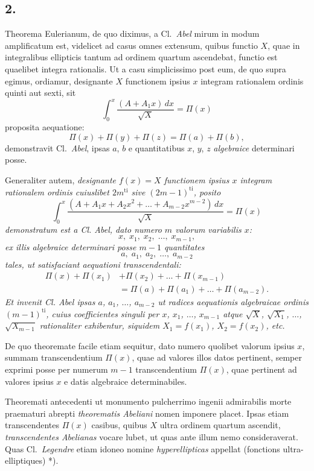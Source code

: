 \documentclass{article}
\begin{document}
\subsection*{2.}

Theorema Eulerianum, de quo diximus, a Cl.\ \emph{Abel} mirum in modum amplificatum est, videlicet ad casus omnes extensum, quibus functio $X$, quae in integralibus ellipticis tantum ad ordinem quartum ascendebat, functio est quaelibet integra rationalis. Ut a casu simplicissimo post eum, de quo supra egimus, ordiamur, designante $X$ functionem ipsius $x$ integram rationalem ordinis quinti aut sexti, sit
\[ \int_0^{x} \frac{(A + A_1 x)\,dx}{\sqrt{X}} = \Pi(x) \]
proposita aequatione:
\[ \Pi(x) + \Pi(y) + \Pi(z) = \Pi(a) + \Pi(b), \]
demonstravit Cl.\ \emph{Abel}, ipsas $a$, $b$ e quantitatibus $x$, $y$, $z$ \emph{algebraice} determinari posse.

Generaliter autem, \emph{designante $f(x) = X$ functionem ipsius $x$ integram rationalem ordinis cuiuslibet $2m^{\text{ti}}$ sive $(2m-1)^{\text{ti}}$, posito}
\[ \int_0^{x} \frac{(A + A_1 x + A_2 x^{2} + \ldots + A_{m-2}x^{m-2})\,dx}{\sqrt{X}} = \Pi(x) \]
\emph{demonstratum est a Cl. Abel, dato numero $m$ valorum variabilis $x$:}
\[ x, \; x_1, \; x_2, \; \ldots, \; x_{m-1}, \]
\emph{ex illis algebraice determinari posse $m-1$ quantitates}
\[ a, \; a_1, \; a_2, \; \ldots, \; a_{m-2} \]
\emph{tales, ut satisfaciant aequationi transcendentali:}
\[ \begin{aligned} \Pi(x) + \Pi(x_1) &+ \Pi(x_2) + \ldots + \Pi(x_{m-1}) \\ &= \Pi(a) + \Pi(a_1) + \ldots + \Pi(a_{m-2}). \end{aligned} \]
\emph{Et invenit Cl. Abel ipsas $a$, $a_1$, $\ldots$, $a_{m-2}$ ut radices aequationis algebraicae ordinis $(m-1)^{\text{ti}}$, cuius coefficientes singuli per $x$, $x_1$, $\ldots$, $x_{m-1}$ atque $\sqrt{X}$, $\sqrt{X_1}$, $\ldots$, $\sqrt{X_{m-1}}$ rationaliter exhibentur, siquidem $X_1 = f(x_1)$, $X_2 = f(x_2)$, etc.}

De quo theoremate facile etiam sequitur, dato numero quolibet valorum ipsius $x$, summam transcendentium $\Pi(x)$, quae ad valores illos datos pertinent, semper exprimi posse per numerum $m-1$ transcendentium $\Pi(x)$, quae pertinent ad valores ipsius $x$ e datis algebraice determinabiles.

Theoremati antecedenti ut monumento pulcherrimo ingenii admirabilis morte praematuri abrepti \emph{theorematis Abeliani} nomen imponere placet. Ipsas etiam transcendentes $\Pi(x)$ casibus, quibus $X$ ultra ordinem quartum ascendit, \emph{transcendentes Abelianas} vocare lubet, ut quas ante illum nemo consideraverat. Quas Cl.\ \emph{Legendre} etiam idoneo nomine \emph{hyperellipticas} appellat (fonctions ultra-elliptiques) *).
\end{document}
